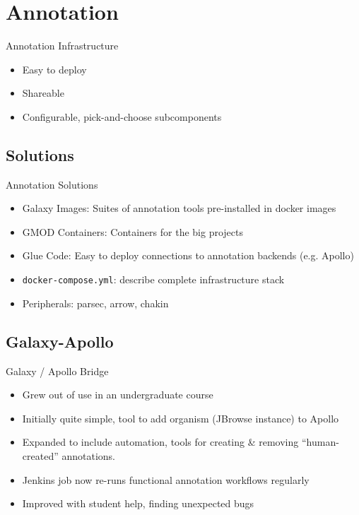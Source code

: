 \documentclass[12pt]{phage3slides} %
\begin{document}
\section{Annotation}
\begin{frame}{Annotation Infrastructure}
    \begin{itemize}
        \item Easy to deploy
        \item Shareable
        \item Configurable, pick-and-choose subcomponents
    \end{itemize}
\end{frame}

\subsection{Solutions}
\begin{frame}{Annotation Solutions}
    \begin{itemize}
        \item Galaxy Images: Suites of annotation tools pre-installed in docker images
        \item GMOD Containers: Containers for the big projects
        \item Glue Code: Easy to deploy connections to annotation backends (e.g. Apollo)
        \item \texttt{docker-compose.yml}: describe complete infrastructure stack
        \item Peripherals: parsec, arrow, chakin
    \end{itemize}
\end{frame}

\subsection{Galaxy-Apollo}
\begin{frame}{Galaxy / Apollo Bridge}
    \begin{itemize}
        \item Grew out of use in an undergraduate course
        \item Initially quite simple, tool to add organism (JBrowse instance) to Apollo
        \item Expanded to include automation, tools for creating \& removing ``human-created'' annotations.
        \item Jenkins job now re-runs functional annotation workflows regularly
        \item Improved with student help, finding unexpected bugs
    \end{itemize}
\end{frame}
\end{document}
